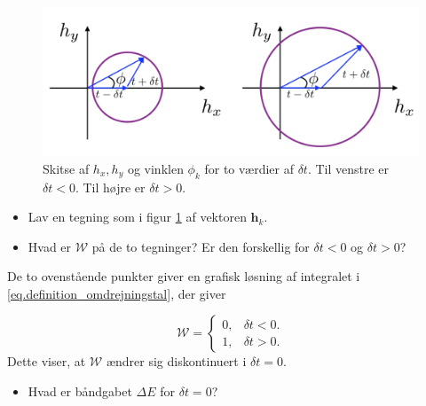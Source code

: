\documentclass[11pt, a4paper]{article}
\begin{document}
\begin{figure}
\begin{center}
\includegraphics[width=1\textwidth]{omdrejning.png} 
\caption{Skitse af $h_x, h_y$ og vinklen $\phi_k$ for to værdier af $\delta t$. Til venstre er $\delta t < 0$. Til højre er $\delta t > 0$. }
\label{fig.omdrejning}
\end{center}
\end{figure}

\begin{itemize}
\item Lav en tegning som i figur \ref{fig.omdrejning} af vektoren $\mathbf{h}_k$. 

\item Hvad er $\mathcal{W}$ på de to tegninger? Er den forskellig for $\delta t < 0$ og $\delta t > 0$? 
\end{itemize}

De to ovenstående punkter giver en grafisk løsning af integralet i \eqref{eq.definition_omdrejningstal}, der giver

\begin{equation}
\mathcal{W} = \left\{\begin{matrix} 0, & \delta t < 0. \\ 1, & \delta t > 0. \end{matrix} \right.
\label{eq.resultat_omdrejning}
\end{equation}
Dette viser, at $\mathcal{W}$ ændrer sig diskontinuert i $\delta t = 0$. 


\begin{itemize}
	\item Hvad er båndgabet $\Delta E$ for $\delta t = 0$? 
\end{itemize}
\end{document}
